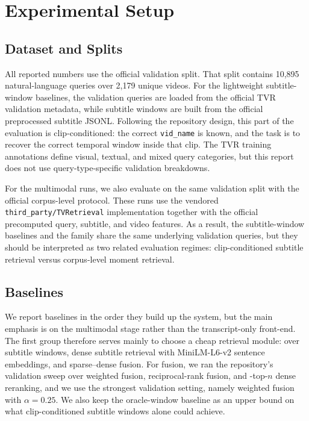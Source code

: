\section{Experimental Setup}
\label{sec:experimental-setup}

\subsection{Dataset and Splits}
All reported numbers use the official \dataset validation split. That split contains 10{,}895 natural-language queries over 2{,}179 unique videos. For the lightweight subtitle-window baselines, the validation queries are loaded from the official TVR validation metadata, while subtitle windows are built from the official preprocessed subtitle JSONL. Following the repository design, this part of the evaluation is clip-conditioned: the correct \texttt{vid\_name} is known, and the task is to recover the correct temporal window inside that clip. The TVR training annotations define visual, textual, and mixed query categories, but this report does not use query-type-specific validation breakdowns.

For the multimodal runs, we also evaluate on the same validation split with the official \xml corpus-level protocol. These runs use the vendored \texttt{third\_party/TVRetrieval} implementation together with the official precomputed query, subtitle, and video features. As a result, the subtitle-window baselines and the \xml family share the same underlying validation queries, but they should be interpreted as two related evaluation regimes: clip-conditioned subtitle retrieval versus corpus-level moment retrieval.

\subsection{Baselines}
We report baselines in the order they build up the system, but the main emphasis is on the multimodal \xml stage rather than the transcript-only front-end. The first group therefore serves mainly to choose a cheap retrieval module: \bm over subtitle windows, dense subtitle retrieval with MiniLM-L6-v2 sentence embeddings, and sparse--dense fusion. For fusion, we ran the repository's validation sweep over weighted fusion, reciprocal-rank fusion, and \bm-top-$n$ dense reranking, and we use the strongest validation setting, namely weighted fusion with $\alpha = 0.25$. We also keep the oracle-window baseline as an upper bound on what clip-conditioned subtitle windows alone could achieve.

